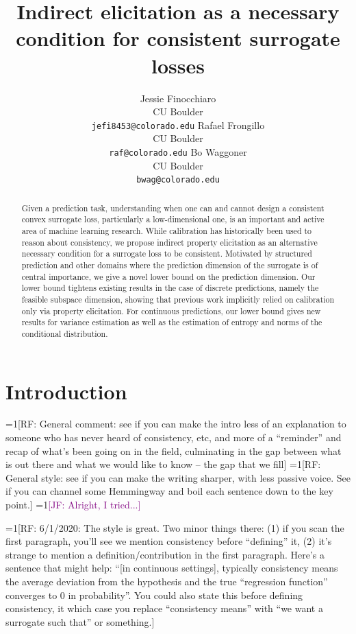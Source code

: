 \documentclass{article}
\title{Indirect elicitation as a necessary condition for consistent surrogate losses}
\author{%
  Jessie Finocchiaro\\
  CU Boulder\\
  \texttt{jefi8453@colorado.edu} 
  \And
   Rafael Frongillo\\
   CU Boulder\\
   \texttt{raf@colorado.edu} 
   \And
   Bo Waggoner\\
   CU Boulder \\
   \texttt{bwag@colorado.edu} 
}
\newcommand{\Comments}{1}
\newcommand{\mynote}[2]{\ifnum\Comments=1\textcolor{#1}{#2}\fi}
\newcommand{\raf}[1]{\mynote{green!80!blue}{[RF: #1]}}
\newcommand{\jessie}[1]{\mynote{purple}{[JF: #1]}}
\begin{document}
\maketitle

\begin{abstract}
Given a prediction task, understanding when one can and cannot design a consistent convex surrogate loss, particularly a low-dimensional one, is an important and active area of machine learning research. 
While calibration has historically been used to reason about consistency, we propose indirect property elicitation as an alternative necessary condition for a surrogate loss to be consistent. 
Motivated by structured prediction and other domains where the prediction dimension of the surrogate is of central importance, we give a novel lower bound on the prediction dimension. 
Our lower bound tightens existing results in the case of discrete predictions, namely the feasible subspace dimension, showing that previous work implicitly relied on calibration only via property elicitation. 
For continuous predictions, our lower bound gives new results for variance estimation as well as the estimation of entropy and norms of the conditional distribution.
\end{abstract}

\section{Introduction}\label{sec:intro}

\raf{General comment: see if you can make the intro less of an explanation to someone who has never heard of consistency, etc, and more of a ``reminder'' and recap of what's been going on in the field, culminating in the gap between what is out there and what we would like to know -- the gap that we fill}
\raf{General style: see if you can make the writing sharper, with less passive voice.  See if you can channel some Hemmingway and boil each sentence down to the key point.}
\jessie{Alright, I tried...}

\raf{6/1/2020: The style is great.  Two minor things there: (1) if you scan the first paragraph, you'll see we mention consistency before ``defining'' it, (2) it's strange to mention a definition/contribution in the first paragraph.  Here's a sentence that might help: ``[in continuous settings], typically consistency means the average deviation from the hypothesis and the true ``regression function'' converges to 0 in probability''.  You could also state this before defining consistency, it which case you replace ``consistency means'' with ``we want a surrogate such that'' or something.}
\end{document}
